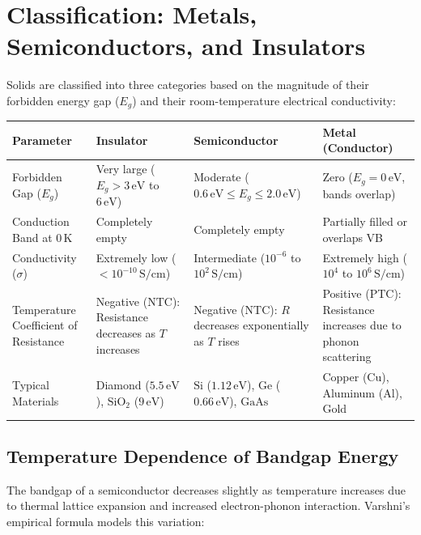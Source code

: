 \documentclass[12pt,a4paper]{article}
\renewcommand{\arraystretch}{1.45}
\begin{document}
\section{Classification: Metals, Semiconductors, and Insulators}

Solids are classified into three categories based on the magnitude of their forbidden energy gap ($E_g$) and their room-temperature electrical conductivity:

\par\vspace{6pt}\noindent
\begingroup
\setlength{\tabcolsep}{3.5pt}
\setlength{\extrarowheight}{3pt}
\renewcommand{\arraystretch}{1.35}
\begin{tabularx}{\linewidth}{|B{2.4cm}|Y|Y|Y|}
\hline
\textbf{Parameter} & \textbf{Insulator} & \textbf{Semiconductor} & \textbf{Metal (Conductor)} \\
\hline
Forbidden Gap ($E_g$) & Very large ($E_g > 3\,\text{eV}$ to $6\,\text{eV}$) & Moderate ($0.6\,\text{eV} \le E_g \le 2.0\,\text{eV}$) & Zero ($E_g = 0\,\text{eV}$, bands overlap) \\
\hline
Conduction Band at $0\,\text{K}$ & Completely empty & Completely empty & Partially filled or overlaps VB \\
\hline
Conductivity ($\sigma$) & Extremely low ($< 10^{-10}\,\text{S/cm}$) & Intermediate ($10^{-6}$ to $10^{2}\,\text{S/cm}$) & Extremely high ($10^{4}$ to $10^{6}\,\text{S/cm}$) \\
\hline
Temperature Coefficient of Resistance & Negative ($\text{NTC}$): Resistance decreases as $T$ increases & Negative ($\text{NTC}$): $R$ decreases exponentially as $T$ rises & Positive ($\text{PTC}$): Resistance increases due to phonon scattering \\
\hline
Typical Materials & Diamond ($5.5\,\text{eV}$), $\text{SiO}_2$ ($9\,\text{eV}$) & $\text{Si}$ ($1.12\,\text{eV}$), $\text{Ge}$ ($0.66\,\text{eV}$), $\text{GaAs}$ & Copper ($\text{Cu}$), Aluminum ($\text{Al}$), Gold \\
\hline
\end{tabularx}
\endgroup

\subsection{Temperature Dependence of Bandgap Energy}
The bandgap of a semiconductor decreases slightly as temperature increases due to thermal lattice expansion and increased electron-phonon interaction. Varshni's empirical formula models this variation:
\end{document}
